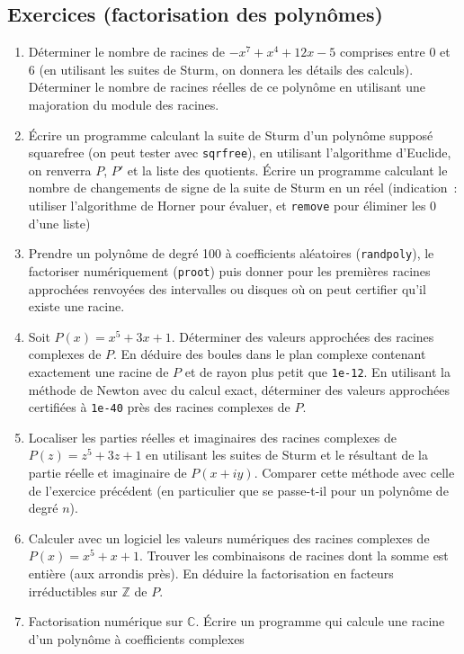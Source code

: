 \documentclass[a4paper,11pt]{article}
\begin{document}
\begin{giacjshere}
\subsection{Exercices (factorisation des polynômes)}
\begin{enumerate}
\item Déterminer le nombre de racines de $-x^7+x^4+12x-5$ comprises
entre 0 et 6 (en utilisant les suites de Sturm, on donnera les
d\'etails des calculs). D\'eterminer le nombre de racines r\'eelles
de ce polyn\^ome en utilisant une majoration du module des racines.
\item \'Ecrire un programme calculant la suite de Sturm d'un polynôme
supposé squarefree (on peut tester avec \verb|sqrfree|), en utilisant
l'algorithme d'Euclide, on renverra $P$, $P'$ et la liste des quotients.
\'Ecrire un programme calculant le nombre de changements de signe
de la suite de Sturm en un r\'eel (indication~: utiliser 
l'algorithme de Horner pour \'evaluer, 
et \verb|remove| pour \'eliminer les 0 d'une liste)
\item Prendre un polyn\^ome de degr\'e 100 \`a coefficients
al\'eatoires (\verb|randpoly|), le factoriser num\'eriquement
(\verb|proot|) puis donner pour les premi\`eres racines
approch\'ees renvoy\'ees des intervalles ou disques o\`u
on peut certifier qu'il existe une racine.
\item Soit $P(x)=x^5+3x+1$. D\'eterminer des valeurs approch\'ees
des racines complexes de $P$. En d\'eduire des boules dans le
plan complexe contenant exactement une racine de $P$ et
de rayon plus petit que \verb|1e-12|. En utilisant la m\'ethode
de Newton avec du calcul exact, d\'eterminer des valeurs approch\'ees
certifi\'ees \`a \verb|1e-40| pr\`es des racines complexes de $P$.
\item Localiser les parties r\'eelles et imaginaires des racines
  complexes de $P(z)=z^5+3z+1$ en utilisant les suites de Sturm
et le r\'esultant de la partie r\'eelle et imaginaire de
$P(x+iy)$. Comparer cette m\'ethode avec celle de l'exercice
pr\'ec\'edent (en particulier que se passe-t-il pour un polyn\^ome
de degr\'e $n$).
\item Calculer avec un logiciel les valeurs numériques des racines
complexes de $P(x)=x^5+x+1$. Trouver les combinaisons de racines
dont la somme est entière (aux arrondis près). En déduire la factorisation
en facteurs irréductibles sur $\mathbb{Z}$ de $P$.
\item Factorisation numérique sur $\mathbb{C}$. \'Ecrire un programme
qui calcule une racine d'un polynôme à coefficients complexes

\end{enumerate}
\end{giacjshere}
\end{document}

